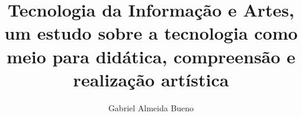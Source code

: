 \documentclass[12pt, a4paper, titlepage, openany]{article}
\author{Gabriel Almeida Bueno}
\affil{FATEC Zona Sul}
\title{Tecnologia da Informação e Artes, um estudo sobre a tecnologia como meio para didática, compreensão e realização artística}
\begin{document}
\nocite{*}
\printbibliography
\end{document}
